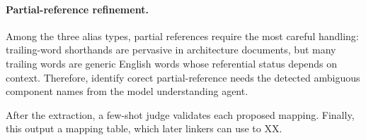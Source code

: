\paragraph{Partial-reference refinement.}
Among the three alias types, partial references require the most careful handling: 
trailing-word shorthands are pervasive in architecture documents, but many trailing words are generic English words whose referential status depends on context.
Therefore, identify corect partial-reference needs the detected ambiguous component names from the model understanding agent.

After the extraction, a few-shot judge validates each proposed mapping.
Finally, this output a mapping table, which later linkers can use to XX. 







